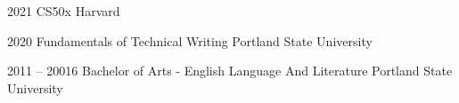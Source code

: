 \documentclass[9pt]{developercv} %
\begin{document}
	\vspace{56pt}
\begin{entrylist}
	\entry
		{2021}
		{CS50x}
		{Harvard}
		
	\entry
		{2020}
		{Fundamentals of Technical Writing}
		{Portland State University}

	\entry
		{2011 -- 20016}
		{Bachelor of Arts - English Language And Literature}
		{Portland State University}

\end{entrylist}

\end{document}
